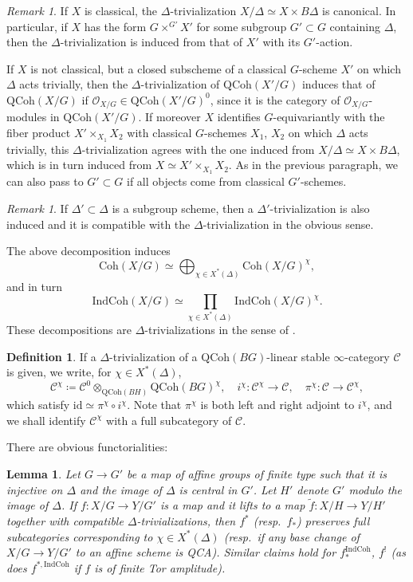 \documentclass{amsart}
\newtheorem{lemma}[theorem]{Lemma}
\theoremstyle{definition}
\newtheorem{definition}[theorem]{Definition}
\theoremstyle{remark}
\newtheorem{remark}[theorem]{Remark}
\numberwithin{equation}{section}
\newcommand{\mc}{\mathcal}
\newcommand{\IndCoh}{\mathrm{IndCoh}}
\newcommand{\QCoh}{\mathrm{QCoh}}
\newcommand{\Coh}{\mathrm{Coh}}
\newcommand{\id}{\mathrm{id}}
\begin{document}
\begin{remark}
If $X$ is classical, the $\Delta$-trivialization $X/\Delta\simeq X\times B\Delta$ is canonical. In particular, if $X$ has the form $G\times^{G'}X'$ for some subgroup $G'\subset G$ containing $\Delta$, then the $\Delta$-trivialization is induced from that of $X'$ with its $G'$-action. 

If $X$ is not classical, but a closed subscheme of a classical $G$-scheme $X'$ on which $\Delta$ acts trivially, then the $\Delta$-trivialization of $\QCoh(X'/ G)$ induces that of $\QCoh(X/G)$ if $\mc O_{X/G}\in \QCoh(X'/G)^0$, since it is the category of $\mathcal{O}_{X/ G}$-modules in $\QCoh(X'/ G)$. If moreover $X$ identifies $ G$-equivariantly with the fiber product $X'\times_{X_1}X_2$ with classical $G$-schemes $X_1$, $X_2$ on which $\Delta$ acts trivially, this $\Delta$-trivialization agrees with the one induced from $X/\Delta\simeq X\times B\Delta$, which is in turn induced from $X\simeq X'\times_{X_1}X_2$. As in the previous paragraph, we can also pass to $G'\subset  G$ if all objects come from classical $G'$-schemes. 
\end{remark}

\begin{remark}
If $\Delta'\subset\Delta$ is a subgroup scheme, then a $\Delta'$-trivialization is also induced and it is compatible with the $\Delta$-trivialization in the obvious sense.  
\end{remark}

The above decomposition induces
\[
\Coh(X/ G) \simeq \bigoplus_{\chi\in X^*(\Delta)}\Coh(X/ G)^\chi, 
\]
and in turn
\[
\IndCoh(X/ G) \simeq \prod_{\chi\in X^*(\Delta)}\IndCoh(X/G)^\chi. 
\]
These decompositions are $\Delta$-trivializations in the sense of \cite[Definition A.19]{BCHNconstructible}. 

\begin{definition}
If a $\Delta$-trivialization of a $\QCoh(B G)$-linear stable $\infty$-category $\mc C$ is given, we write, for $\chi \in X^*(\Delta)$, 
\[
\mc C^\chi \coloneq\mc C^0 \otimes_{\QCoh(BH)}\QCoh( BG)^{\chi},\quad i^\chi\colon \mc C^\chi \to \mc C, \quad \pi^\chi\colon \mc C \to \mc C^\chi,
\]
which satisfy $\id \simeq \pi^\chi\circ i^\chi$. Note that $\pi^\chi$ is both left and right adjoint to $i^\chi$, and we shall identify $\mc C^\chi$ with a full subcategory of $\mc C$. 
\end{definition}

There are obvious functorialities:

\begin{lemma}
Let $ G\to G'$ be a map of affine groups of finite type such that it is injective on $\Delta$ and the image of $\Delta$ is central in $G'$. Let $H'$ denote $G'$ modulo the image of $\Delta$. If $f\colon X/ G\to Y/G'$ is a map and it lifts to a map $\widetilde{f}\colon X/H\to Y/H'$ together with compatible $\Delta$-trivializations, then $f^*$ (resp.~$f_*$) preserves full subcategories corresponding to $\chi\in X^*(\Delta)$ (resp.~if any base change of $X/G\to Y/G'$ to an affine scheme is QCA). Similar claims hold for $f_*^{\IndCoh}$, $f^!$ (as does $f^{*,\IndCoh}$ if $f$ is of finite Tor amplitude). 
\end{lemma}
\end{document}
